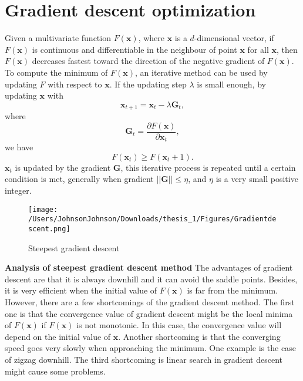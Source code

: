  \section{Gradient descent optimization}
 Given a multivariate function $F(\bm{x})$, where $\bm{x}$ is a $d$-dimensional vector, if $F(\bm{x})$ is continuous and differentiable in the neighbour of point $\bm{x}$ for all $\bm{x}$, then $F(\bm{x})$ decreases fastest toward the direction of the negative gradient of $F(\bm{x})$. To compute the minimum of $F(\bm{x})$, an iterative method can be used by updating $F$ with respect to $\bm{x}$. If the updating step $\lambda$ is small enough, by updating $\bm{x}$ with 
 \begin{equation}
 \bm{x}_{t+1} = \bm{x}_{t} - \lambda \bm{G}_t,
 \end{equation}
where 
 \begin{equation}
 \bm{G}_t = \frac{\partial F(\bm{x})}{\partial \bm{x}_t},
 \end{equation}
we have 
  \begin{equation}
 F(\bm{x}_{t}) \ge F(\bm{x}_t+1).
  \end{equation}
$\bm{x}_t$ is updated by the gradient $\bm{G}$, this iterative process is repeated until a certain condition is met, generally when gradient $||\bm{G}|| \le \eta$, and $\eta$ is a very small positive integer. 
\begin{figure}
\centering
\texttt{[image: /Users/JohnsonJohnson/Downloads/thesis\_1/Figures/Gradientdescent.png]}
\caption{Steepest gradient descent}
\vspace{0em}
\end{figure} 

\textbf{Analysis of steepest gradient descent method} The advantages of gradient descent are that it is always downhill and it can avoid the saddle points. Besides, it is very efficient when the initial value of $F(\bm{x})$ is far from the minimum. However, there are a few shortcomings of the gradient descent method. The first one is that the convergence value of gradient descent might be the local minima of $F(\bm{x})$ if $F(\bm{x})$ is not monotonic. In this case, the convergence value will depend on the initial value of $\bm{x}$. Another shortcoming is that the converging speed goes very slowly when approaching the minimum. One example is the case of zigzag downhill. The third shortcoming is linear search in gradient descent might cause some problems.

